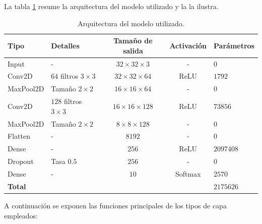 La tabla \ref{tab:model_architecture} resume la arquitectura del modelo utilizado y la  la ilustra.

\begin{table}[H]
    \centering
    \caption{Arquitectura del modelo utilizado.}
    \footnotesize
    \begin{tabularx}{\textwidth}{l l c c >{\centering\arraybackslash}X}
            \toprule
        Tipo & Detalles & Tamaño de salida & Activación & Parámetros \\
        \midrule
        Input & - & $32 \times 32 \times 3$ & - & $0$ \\
        Conv2D & $64$ filtros $3 \times 3$ & $32 \times 32 \times 64$ & ReLU & $1792$ \\
        MaxPool2D & Tamaño $2 \times 2$ & $16 \times 16 \times 64$ & - & $0$ \\
        Conv2D & $128$ filtros $3 \times 3$ & $16 \times 16 \times 128$ & ReLU & $73856$ \\
        MaxPool2D & Tamaño $2 \times 2$ & $8 \times 8 \times 128$ & - & $0$ \\
        Flatten & - & $8192$ & - & $0$ \\
        Dense & - & $256$ & ReLU & $2097408$ \\
        Dropout & Tasa $0.5$ & $256$ & - & $0$ \\
        Dense & - & $10$ & Softmax & $2570$ \\
        \midrule
        \textbf{Total} & & & & \textbf{$2175626$} \\
        \bottomrule
    \end{tabularx}
    \label{tab:model_architecture}
\end{table}


A continuación se exponen las funciones principales de los tipos de capa empleados:

